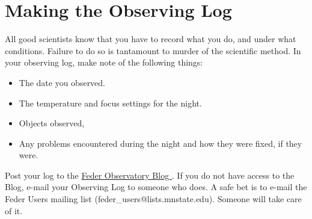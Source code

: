 \documentclass[letterpaper, 12pt]{report}
\begin{document}
\chapter{Making the Observing Log}\label{ch:6}
All good scientists know that you have to record what you do, and under what conditions. Failure to do so is tantamount to murder of the scientific method. In your observing log, make note of the following things:
\begin{itemize}
	\item The date you observed.
	\item The temperature and focus settings for the night.
	\item Objects observed,
	\item Any problems encountered during the night and how they were fixed, if they were.
\end{itemize}

Post your log to the \href{(http://astronomy.mnstate.edu/Feder_Observatory/}{Feder Observatory Blog }. If you do not have access to the Blog, e-mail your Observing Log to someone who does. A safe bet is to e-mail the Feder Users mailing list (feder\_users@lists.mnstate.edu). Someone will take care of it.

\newpage
\end{document}
